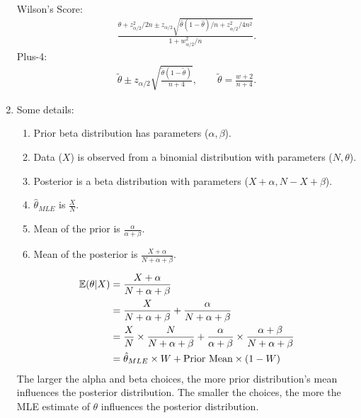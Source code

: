 \documentclass[12pt]{amsart}
\begin{document}
\begin{enumerate}
\begin{align}
    \end{align}
    Wilson's Score:
    \begin{align}
        \frac{\widehat{\theta} + z_{\alpha/2}^2/2n \pm z_{\alpha/2} \sqrt{\widehat{\theta} (1-\widehat{\theta})/n + z_{\alpha/2}^2/4n^2}}{1+w_{\alpha/2}^2/n}.
    \end{align}
    Plus-4:
    \begin{align}
        \tilde{\theta} \pm z_{\alpha/2} \sqrt{\frac{\tilde{\theta} (1-\tilde{\theta})}{n+4}}, \qquad \tilde{\theta} = \frac{w+2}{n+4}.
    \end{align}
    \item Some details:
    \begin{enumerate}
    	\item Prior beta distribution has parameters ($\alpha, \beta$).
    	\item Data ($X$) is observed from a binomial distribution with parameters ($N, \theta$).
    	\item Posterior is a beta distribution with parameters ($X+\alpha, N-X+\beta$).
    	\item $\hat \theta_{MLE}$ is $\frac{X}{N}$.
    	\item Mean of the prior is $\frac{\alpha}{\alpha+\beta}$.
    	\item Mean of the posterior is $\frac{X+\alpha}{N+\alpha+\beta}$.
    \end{enumerate}

	\begin{align}
		\mathbb{E}(\theta | X)  &= \frac{X+\alpha}{N+\alpha+\beta} \notag \\
		&= \frac{X}{N+\alpha+\beta} + \frac{\alpha}{N+\alpha+\beta} \notag \\
		&= \frac{X}{N} \times \frac{N}{N+\alpha+\beta} + \frac{\alpha}{\alpha+\beta} \times \frac{\alpha+\beta}{N+\alpha+\beta} \notag \\
		&= \hat \theta_{MLE} \times W +  \text{Prior Mean} \times (1-W) \notag
	\end{align}
    The larger the alpha and beta choices, the more prior distribution's mean influences the  posterior distribution. The smaller the choices, the more the MLE estimate of $\theta$ influences the posterior distribution.
\end{enumerate}


\clearpage
\end{document}
